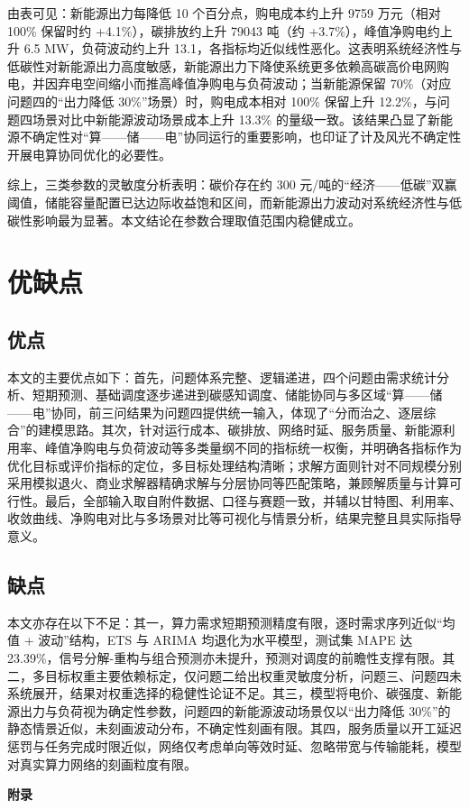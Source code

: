 \documentclass{ctexart}
\begin{document}
由表可见：新能源出力每降低 10 个百分点，购电成本约上升 9759 万元（相对 100\% 保留时约 +4.1\%），碳排放约上升 79043 吨（约 +3.7\%），峰值净购电约上升 6.5 MW，负荷波动约上升 13.1，各指标均近似线性恶化。这表明系统经济性与低碳性对新能源出力高度敏感，新能源出力下降使系统更多依赖高碳高价电网购电，并因弃电空间缩小而推高峰值净购电与负荷波动；当新能源保留 70\%（对应问题四的“出力降低 30\%”场景）时，购电成本相对 100\% 保留上升 12.2\%，与问题四场景对比中新能源波动场景成本上升 13.3\% 的量级一致。该结果凸显了新能源不确定性对“算——储——电”协同运行的重要影响，也印证了计及风光不确定性开展电算协同优化的必要性\cite{wangyihang2026}。

综上，三类参数的灵敏度分析表明：碳价存在约 300 元/吨的“经济——低碳”双赢阈值，储能容量配置已达边际收益饱和区间，而新能源出力波动对系统经济性与低碳性影响最为显著。本文结论在参数合理取值范围内稳健成立。
\section{优缺点}
\subsection{优点}
本文的主要优点如下：首先，问题体系完整、逻辑递进，四个问题由需求统计分析、短期预测、基础调度逐步递进到碳感知调度、储能协同与多区域“算——储——电”协同，前三问结果为问题四提供统一输入，体现了“分而治之、逐层综合”的建模思路。其次，针对运行成本、碳排放、网络时延、服务质量、新能源利用率、峰值净购电与负荷波动等多类量纲不同的指标统一权衡，并明确各指标作为优化目标或评价指标的定位，多目标处理结构清晰；求解方面则针对不同规模分别采用模拟退火、商业求解器精确求解与分层协同等匹配策略，兼顾解质量与计算可行性。最后，全部输入取自附件数据、口径与赛题一致，并辅以甘特图、利用率、收敛曲线、净购电对比与多场景对比等可视化与情景分析，结果完整且具实际指导意义。
\subsection{缺点}
本文亦存在以下不足：其一，算力需求短期预测精度有限，逐时需求序列近似“均值 + 波动”结构，ETS 与 ARIMA 均退化为水平模型，测试集 MAPE 达 23.39\%，信号分解-重构与组合预测亦未提升，预测对调度的前瞻性支撑有限。其二，多目标权重主要依赖标定，仅问题二给出权重灵敏度分析，问题三、问题四未系统展开，结果对权重选择的稳健性论证不足。其三，模型将电价、碳强度、新能源出力与负荷视为确定性参数，问题四的新能源波动场景仅以“出力降低 30\%”的静态情景近似，未刻画波动分布，不确定性刻画有限。其四，服务质量以开工延迟惩罚与任务完成时限近似，网络仅考虑单向等效时延、忽略带宽与传输能耗，模型对真实算力网络的刻画粒度有限。
\newpage
\printbibliography
\newpage
\appendix
\begin{center}
	\Large\textbf{附录}
\end{center}
\end{document}
